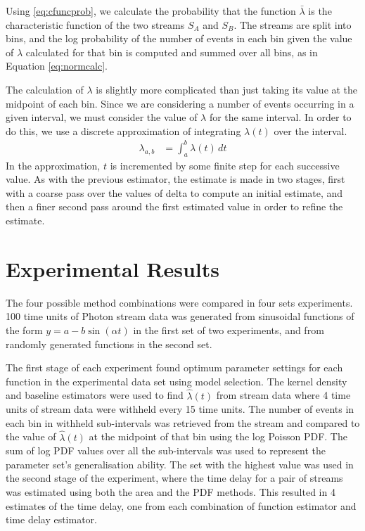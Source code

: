 \documentclass[11pt]{article}
\begin{document}
   Using \eqref{eq:cfuncprob}, we calculate the probability that the function $\bar{\lambda}$ is the
   characteristic function of the two streams $S_A$ and $S_B$. The streams are
   split into bins, and the log probability of the number of events in each bin
   given the value of $\lambda$ calculated for that bin is computed and summed
   over all bins, as in Equation \eqref{eq:normcalc}.

   The calculation of $\lambda$ is slightly more complicated than just taking
   its value at the midpoint of each bin. Since we are considering a number of
   events occurring in a given interval, we must consider the value of $\lambda$
   for the same interval. In order to do this, we use a discrete approximation
   of integrating $\lambda(t)$ over the interval.
   \begin{align}
   \lambda_{a,b}&=\int_a^b\lambda(t)\,dt
   \end{align}
   In the approximation, $t$ is incremented by some finite step for each
   successive value. As with the previous estimator, the estimate is made in two
   stages, first with a coarse pass over the values of delta to compute an
   initial estimate, and then a finer second pass around the first estimated
   value in order to refine the estimate.
\section{Experimental Results}
\label{sec-5}

  The four possible method combinations were compared in four sets
  experiments. 100 time units of Photon stream data was generated from
  sinusoidal functions of the form $y=a-b\sin(\alpha t)$ in the first set of two
  experiments, and from randomly generated functions in the second set.

  The first stage of each experiment found optimum parameter settings for each
  function in the experimental data set using model selection. The kernel
  density and baseline estimators were used to find $\hat{\lambda}(t)$ from
  stream data where 4 time units of stream data were withheld every 15 time
  units. The number of events in each bin in withheld sub-intervals was
  retrieved from the stream and compared to the value of $\hat{\lambda}(t)$ at
  the midpoint of that bin using the log Poisson PDF. The sum of log PDF values
  over all the sub-intervals was used to represent the parameter set's
  generalisation ability. The set with the highest value was used in the second
  stage of the experiment, where the time delay for a pair of streams was
  estimated using both the area and the PDF methods. This resulted in 4
  estimates of the time delay, one from each combination of function estimator
  and time delay estimator.
\end{document}
